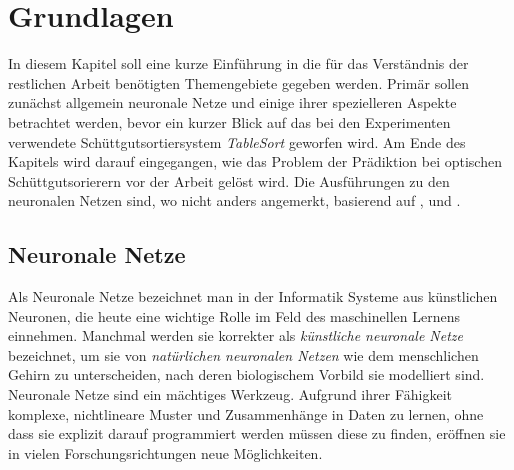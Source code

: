\chapter{Grundlagen}
\label{cap:basics}



In diesem Kapitel soll eine kurze Einführung in die für das Verständnis der restlichen Arbeit benötigten Themengebiete gegeben werden.
Primär sollen zunächst allgemein neuronale Netze und einige ihrer spezielleren Aspekte betrachtet werden, 
bevor ein kurzer Blick auf das bei den Experimenten verwendete Schüttgutsortiersystem \textit{TableSort} geworfen wird. 
Am Ende des Kapitels wird darauf eingegangen, wie das Problem der Prädiktion bei optischen Schüttgutsorierern vor der Arbeit gelöst wird.
Die Ausführungen zu den neuronalen Netzen sind, wo nicht anders angemerkt, basierend auf \cite{Goodfellow-et-al-2016}, \cite{Murphy:2012:MLP:2380985} und \cite{nielsen2015neural}.

% 

\section{Neuronale Netze}

Als Neuronale Netze  %
bezeichnet man in der Informatik Systeme aus künstlichen Neuronen, die heute eine wichtige Rolle im Feld des maschinellen Lernens einnehmen.
Manchmal werden sie korrekter als \textit{künstliche neuronale Netze} bezeichnet, um sie von \textit{natürlichen neuronalen Netzen} 
wie dem menschlichen Gehirn zu unterscheiden, nach deren biologischem Vorbild sie modelliert sind.
Neuronale Netze sind ein mächtiges Werkzeug. 
Aufgrund ihrer Fähigkeit komplexe, nichtlineare Muster und Zusammenhänge in Daten zu lernen, 
ohne dass sie explizit darauf programmiert werden müssen diese zu finden,
eröffnen sie in vielen Forschungsrichtungen neue Möglichkeiten.


